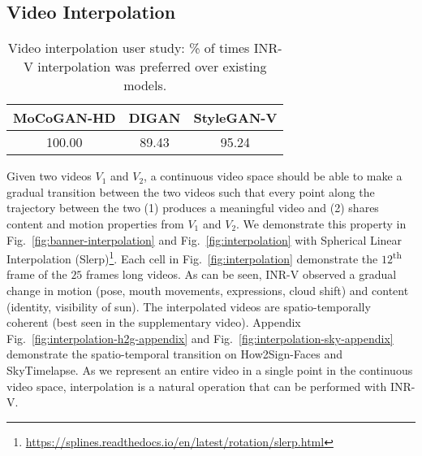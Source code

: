 \documentclass[10pt]{article} \usepackage[accepted]{tmlr}
\begin{document}
\subsection{Video Interpolation}
\label{sec:video-interpolation}

\begin{wraptable}[8]{R}{5.5cm}
\vspace{-5pt}
\centering
\begin{adjustbox}{max width=\linewidth}
\begin{tabular}{ccc}
\toprule  
MoCoGAN-HD & DIGAN & StyleGAN-V
\\ \midrule
100.00 & 89.43 & 95.24\\
\bottomrule
\end{tabular}
\end{adjustbox}
\caption{\small Video interpolation user study: \% of times INR-V interpolation was preferred over existing models.}
\label{tab:user-study-interpolation}

\end{wraptable}

Given two videos $V_1$ and $V_2$, a continuous video space should be able to make a gradual transition between the two videos such that every point along the trajectory between the two (1) produces a meaningful video and (2) shares content and motion properties from $V_1$ and $V_2$. We demonstrate this property in Fig.~\ref{fig:banner-interpolation} and Fig.~\ref{fig:interpolation} with Spherical Linear Interpolation (Slerp)\def\thefootnote{$^2$}\footnote{\href{https://splines.readthedocs.io/en/latest/rotation/slerp.html}{https://splines.readthedocs.io/en/latest/rotation/slerp.html}}. Each cell in Fig.~\ref{fig:interpolation} demonstrate the $12$\textsuperscript{th} frame of the $25$ frames long videos. 
As can be seen, INR-V observed a gradual change in motion (pose, mouth movements, expressions, cloud shift) and content (identity, visibility of sun). The interpolated videos are spatio-temporally coherent (best seen in the supplementary video). Appendix Fig.~\ref{fig:interpolation-h2g-appendix} and Fig.~\ref{fig:interpolation-sky-appendix} demonstrate the spatio-temporal transition on How2Sign-Faces and SkyTimelapse. As we represent an entire video in a single point in the continuous video space, interpolation is a natural operation that can be performed with INR-V. 
\end{document}
